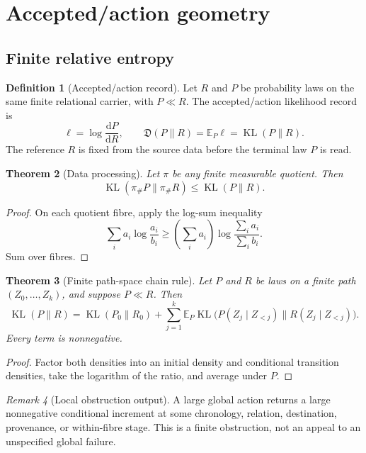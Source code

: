 \documentclass[11pt]{article}
\newtheorem{theorem}{Theorem}[section]
\theoremstyle{definition}
\newtheorem{definition}[theorem]{Definition}
\theoremstyle{remark}
\newtheorem{remark}[theorem]{Remark}
\newcommand{\E}{\mathbb E}
\newcommand{\KL}{\operatorname{KL}}
\newcommand{\dd}{\mathrm d}
\begin{document}
\section{Accepted/action geometry}
\label{sec:gran-action}

\subsection{Finite relative entropy}

\begin{definition}[Accepted/action record]
Let $R$ and $P$ be probability laws on the same finite relational carrier,
with $P\ll R$.  The accepted/action likelihood record is
\[
 \ell=\log\frac{\dd P}{\dd R},
 \qquad
 \mathfrak D(P\|R)=\E_P\ell=\KL(P\|R).
\]
The reference $R$ is fixed from the source data before the terminal law $P$ is
read.
\end{definition}

\begin{theorem}[Data processing]
Let $\pi$ be any finite measurable quotient.  Then
\[
 \KL(\pi_\#P\|\pi_\#R)\le\KL(P\|R).
\]
\end{theorem}

\begin{proof}
On each quotient fibre, apply the log-sum inequality
\[
 \sum_i a_i\log\frac{a_i}{b_i}
 \ge\left(\sum_i a_i\right)
 \log\frac{\sum_i a_i}{\sum_i b_i}.
\]
Sum over fibres.
\end{proof}

\begin{theorem}[Finite path-space chain rule]
Let $P$ and $R$ be laws on a finite path
$(Z_0,\ldots,Z_k)$, and suppose $P\ll R$.  Then
\[
 \KL(P\|R)
 =\KL(P_0\|R_0)
 +\sum_{j=1}^k
 \E_P\KL\bigl(P(Z_j\mid Z_{<j})\|R(Z_j\mid Z_{<j})\bigr).
\]
Every term is nonnegative.
\end{theorem}

\begin{proof}
Factor both densities into an initial density and conditional transition
densities, take the logarithm of the ratio, and average under $P$.
\end{proof}

\begin{remark}[Local obstruction output]
A large global action returns a large nonnegative conditional increment at
some chronology, relation, destination, provenance, or within-fibre stage.
This is a finite obstruction, not an appeal to an unspecified global failure.
\end{remark}
\end{document}
